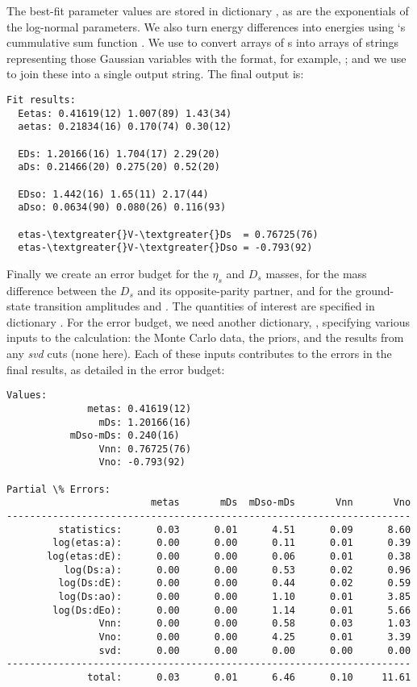 \documentclass[letterpaper,10pt,english]{sphinxmanual}
\begin{document}
The best-fit parameter values are stored in dictionary ,
as are the exponentials of the log-normal parameters.
We also turn energy differences into energies using `s cummulative
sum function . We use  to convert arrays
of s into arrays of strings representing those Gaussian variables
with the format, for example, ; and we use  to join
these into a single output string. The final output is:

\begin{Verbatim}[commandchars=\\\{\}]
Fit results:
  Eetas: 0.41619(12) 1.007(89) 1.43(34)
  aetas: 0.21834(16) 0.170(74) 0.30(12)

  EDs: 1.20166(16) 1.704(17) 2.29(20)
  aDs: 0.21466(20) 0.275(20) 0.52(20)

  EDso: 1.442(16) 1.65(11) 2.17(44)
  aDso: 0.0634(90) 0.080(26) 0.116(93)

  etas-\textgreater{}V-\textgreater{}Ds  = 0.76725(76)
  etas-\textgreater{}V-\textgreater{}Dso = -0.793(92)
\end{Verbatim}

Finally we  create an error budget for the $\eta_s$
and $D_s$ masses, for the mass difference between the $D_s$ and its
opposite-parity partner, and for the ground-state transition amplitudes
 and . The quantities of interest are specified in dictionary
. For the error budget, we need another dictionary, ,
specifying various inputs to the calculation: the Monte Carlo data, the
priors, and the results from any \emph{svd} cuts (none here). Each of these inputs
contributes to the errors in the final results, as detailed in the
error budget:

\begin{Verbatim}[commandchars=\\\{\}]
Values:
              metas: 0.41619(12)
                mDs: 1.20166(16)
           mDso-mDs: 0.240(16)
                Vnn: 0.76725(76)
                Vno: -0.793(92)

Partial \% Errors:
                         metas       mDs  mDso-mDs       Vnn       Vno
----------------------------------------------------------------------
         statistics:      0.03      0.01      4.51      0.09      8.60
        log(etas:a):      0.00      0.00      0.11      0.01      0.39
       log(etas:dE):      0.00      0.00      0.06      0.01      0.38
          log(Ds:a):      0.00      0.00      0.53      0.02      0.96
         log(Ds:dE):      0.00      0.00      0.44      0.02      0.59
         log(Ds:ao):      0.00      0.00      1.10      0.01      3.85
        log(Ds:dEo):      0.00      0.00      1.14      0.01      5.66
                Vnn:      0.00      0.00      0.58      0.03      1.03
                Vno:      0.00      0.00      4.25      0.01      3.39
                svd:      0.00      0.00      0.00      0.00      0.00
----------------------------------------------------------------------
              total:      0.03      0.01      6.46      0.10     11.61
\end{Verbatim}
\end{document}
